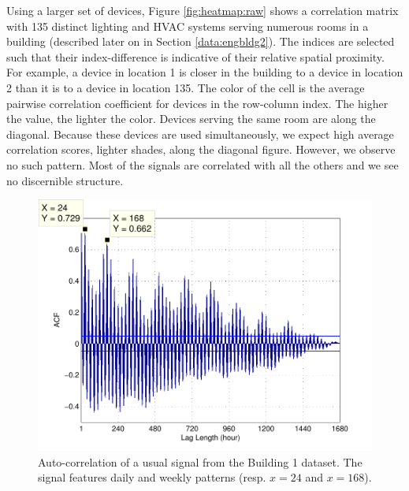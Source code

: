Using a larger set of devices, Figure \ref{fig:heatmap:raw} shows a correlation matrix with 135 distinct lighting and HVAC systems serving numerous rooms in a building (described later on in Section \ref{data:engbldg2}).
The indices are selected such that their index-difference is indicative of their relative spatial proximity.  
For example, a device in location 1 is closer in the building to a device in location 2 than it is to 
a device in location 135. 
The color of the cell is the average pairwise correlation coefficient for devices in the row-column index.  The higher the value, the lighter the color.
Devices serving the same room are along the diagonal.  Because these devices are used simultaneously, we expect
high average correlation scores, lighter shades, along the diagonal figure.
However, we observe no such pattern.  %
Most of the signals are correlated with all the others and we see no discernible structure.

\begin{figure}[t!]
\begin{center}
\includegraphics[width=.5\textwidth]{img/acf_101A1_GHP-eps-converted-to.pdf}
\caption{Auto-correlation of a usual signal from the Building 1 dataset.
The signal features daily and weekly patterns (resp. $x=24$ and $x=168$).}
\label{fig:autocorr}
\end{center}
\end{figure}

